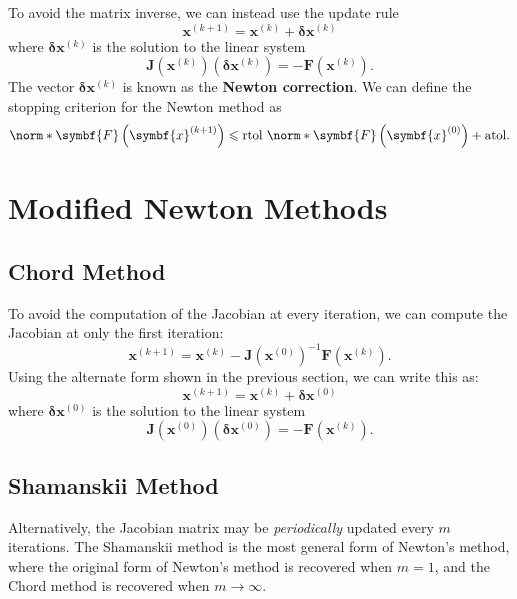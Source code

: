 \documentclass{article}
\begin{document}
To avoid the matrix inverse, we can instead use the update rule
\begin{equation*}
    \symbf{x}^{\left( k+1 \right)} = \symbf{x}^{\left( k \right)} + \symbf{\delta} \symbf{x}^{\left( k \right)}
\end{equation*}
where \(\symbf{\delta} \symbf{x}^{\left( k \right)}\) is the solution to
the linear system
\begin{equation*}
    \symbf{J}\left( \symbf{x}^{\left( k \right)} \right) \left( \symbf{\delta} \symbf{x}^{\left( k \right)} \right) = -\symbf{F}\left( \symbf{x}^{\left( k \right)} \right).
\end{equation*}
The vector \(\symbf{\delta} \symbf{x}^{\left( k \right)}\) is known as
the \textbf{Newton correction}. We can define the stopping criterion for
the Newton method as
\begin{equation*}
    \norm*{\symbf{F}\left( \symbf{x}^{\left( k + 1 \right)} \right)} \leqslant \text{rtol}\ \norm*{\symbf{F}\left( \symbf{x}^{\left( 0 \right)} \right)} + \text{atol}.
\end{equation*}
\section{Modified Newton Methods}
\subsection{Chord Method}
To avoid the computation of the Jacobian at every iteration, we can
compute the Jacobian at only the first iteration:
\begin{equation*}
    \symbf{x}^{\left( k+1 \right)} = \symbf{x}^{\left( k \right)} - \symbf{J}\left( \symbf{x}^{\left( 0 \right)} \right)^{-1} \symbf{F}\left( \symbf{x}^{\left( k \right)} \right).
\end{equation*}
Using the alternate form shown in the previous section, we can write
this as:
\begin{equation*}
    \symbf{x}^{\left( k+1 \right)} = \symbf{x}^{\left( k \right)} + \symbf{\delta} \symbf{x}^{\left( 0 \right)}
\end{equation*}
where \(\symbf{\delta} \symbf{x}^{\left( 0 \right)}\) is the solution to
the linear system
\begin{equation*}
    \symbf{J}\left( \symbf{x}^{\left( 0 \right)} \right) \left( \symbf{\delta} \symbf{x}^{\left( 0 \right)} \right) = -\symbf{F}\left( \symbf{x}^{\left( k \right)} \right).
\end{equation*}
\subsection{Shamanskii Method}
Alternatively, the Jacobian matrix may be \textit{periodically} updated
every \(m\) iterations. The Shamanskii method is the most general form
of Newton's method, where the original form of Newton's method is
recovered when \(m = 1\), and the Chord method is recovered when \(m
\to \infty\).
\end{document}
